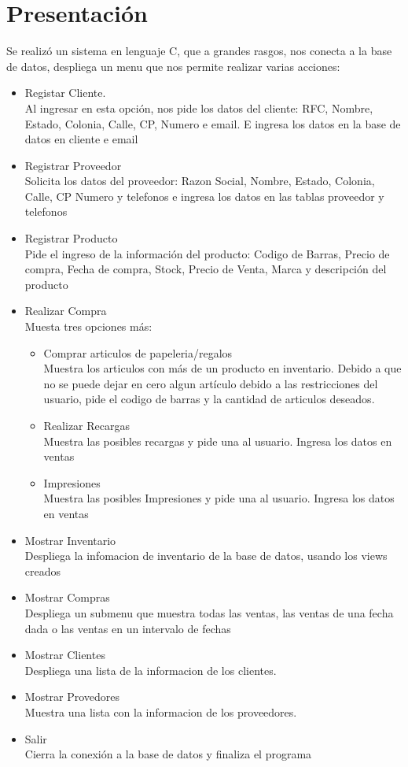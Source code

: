 \documentclass[letter,12pt]{article}
\begin{document}
\section{Presentaci\'on}
Se realizó un sistema en lenguaje C, que a grandes rasgos, nos conecta a la base de datos, despliega un menu que nos permite realizar varias acciones:
\begin{itemize}
\item Registar Cliente.\\
Al ingresar en esta opción, nos pide los datos del cliente: RFC, Nombre, Estado, Colonia, Calle, CP, Numero e email. E ingresa los datos en la base de datos en cliente e email
\item Registrar Proveedor\\
Solicita los datos del proveedor: Razon Social, Nombre, Estado, Colonia, Calle, CP Numero y telefonos e ingresa los datos en las tablas proveedor y telefonos
\item Registrar Producto\\
Pide el ingreso de la información del producto: Codigo de Barras, Precio de compra, Fecha de compra, Stock, Precio de Venta, Marca y descripción del producto
\item Realizar Compra\\
Muesta tres opciones más:
\begin{itemize}
\item Comprar articulos de papeleria/regalos\\
Muestra los articulos con más de un producto en inventario. Debido a que no se puede dejar en cero algun artículo debido a las restricciones del usuario, pide el codigo de barras y la cantidad de articulos deseados.
\item Realizar Recargas\\
Muestra las posibles recargas y pide una al usuario. Ingresa los datos en ventas
\item Impresiones\\
Muestra las posibles Impresiones y pide una al usuario. Ingresa los datos en ventas
\end{itemize}
\item Mostrar Inventario\\
Despliega la infomacion de inventario de la base de datos, usando los views creados
\newpage
\item Mostrar Compras\\
Despliega un submenu que  muestra todas las ventas, las ventas de una fecha dada o las ventas en un intervalo de fechas
\item Mostrar Clientes\\
Despliega una lista de la informacion de los clientes.
\item Mostrar Provedores\\
Muestra una lista con la informacion de los proveedores.
\item Salir\\
Cierra la conexión a la base de datos y finaliza el programa
\end{itemize}
\end{document}
